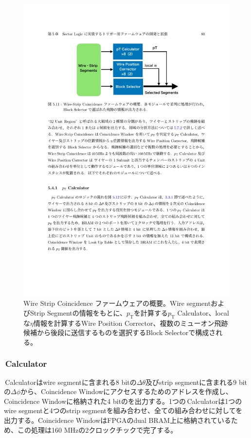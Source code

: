 \begin{figure} 
\centering
\includegraphics[width=16cm]{fig/SL/WS_logic.pdf}
\caption[Wire Strip Coincidence ファームウェアの概要]{Wire Strip Coincidence ファームウェアの概要\cite{mt_kawamoto}。Wire segmentおよびStrip Segmentの情報をもとに、$p_\mathrm{T}$を計算する$p_\mathrm{T}$ Calculator、localな$\eta$情報を計算するWire Position Corrector、複数のミューオン飛跡候補から後段に送信するものを選択するBlock Selectorで構成される。}
\label{WS_logic}
\end{figure}

\subsubsection*{\pt\,Calculator}
\pt\,Calculatorはwire segmentに含まれる8 bitの$\Delta\theta$及びstrip segmentに含まれる9 bitの$\Delta\phi$から、Coincidence Windowにアクセスするためのアドレスを作成し、Coincidence Windowに格納された4 bitの\pt を出力する。1つの\pt\,Calculatorは1つのwire segmentと4つのstrip segmentを組み合わせ、全ての組み合わせに対して\pt を出力する。Coincidence WindowはFPGAのdual BRAM上に格納されているため、この処理は160 MHzの2クロックチックで完了する。


